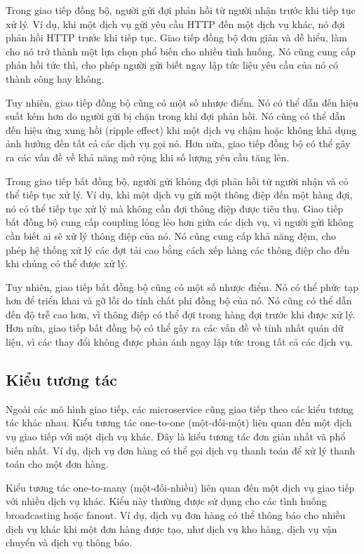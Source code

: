 Trong giao tiếp đồng bộ, người gửi đợi phản hồi từ người nhận trước khi tiếp
tục xử lý. Ví dụ, khi một dịch vụ gửi yêu cầu HTTP đến một dịch vụ khác, nó đợi
phản hồi HTTP trước khi tiếp tục. Giao tiếp đồng bộ đơn giản và dễ hiểu, làm
cho nó trở thành một lựa chọn phổ biến cho nhiều tình huống. Nó cũng cung cấp
phản hồi tức thì, cho phép người gửi biết ngay lập tức liệu yêu cầu của nó có
thành công hay không.

Tuy nhiên, giao tiếp đồng bộ cũng có một số nhược điểm. Nó có thể dẫn đến hiệu
suất kém hơn do người gửi bị chặn trong khi đợi phản hồi. Nó cũng có thể dẫn
đến hiệu ứng xung hồi (ripple effect) khi một dịch vụ chậm hoặc không khả dụng
ảnh hưởng đến tất cả các dịch vụ gọi nó. Hơn nữa, giao tiếp đồng bộ có thể gây
ra các vấn đề về khả năng mở rộng khi số lượng yêu cầu tăng lên.

Trong giao tiếp bất đồng bộ, người gửi không đợi phản hồi từ người nhận và có
thể tiếp tục xử lý. Ví dụ, khi một dịch vụ gửi một thông điệp đến một hàng đợi,
nó có thể tiếp tục xử lý mà không cần đợi thông điệp được tiêu thụ. Giao tiếp
bất đồng bộ cung cấp coupling lỏng lẻo hơn giữa các dịch vụ, vì người gửi không
cần biết ai sẽ xử lý thông điệp của nó. Nó cũng cung cấp khả năng đệm, cho phép
hệ thống xử lý các đợt tải cao bằng cách xếp hàng các thông điệp cho đến khi
chúng có thể được xử lý.

Tuy nhiên, giao tiếp bất đồng bộ cũng có một số nhược điểm. Nó có thể phức tạp
hơn để triển khai và gỡ lỗi do tính chất phi đồng bộ của nó. Nó cũng có thể dẫn
đến độ trễ cao hơn, vì thông điệp có thể đợi trong hàng đợi trước khi được xử
lý. Hơn nữa, giao tiếp bất đồng bộ có thể gây ra các vấn đề về tính nhất quán
dữ liệu, vì các thay đổi không được phản ánh ngay lập tức trong tất cả các dịch
vụ.

\subsection{Kiểu tương tác}
Ngoài các mô hình giao tiếp, các microservice cũng giao tiếp theo các kiểu
tương tác khác nhau. Kiểu tương tác one-to-one (một-đối-một) liên quan đến một
dịch vụ giao tiếp với một dịch vụ khác. Đây là kiểu tương tác đơn giản nhất và
phổ biến nhất. Ví dụ, dịch vụ đơn hàng có thể gọi dịch vụ thanh toán để xử lý
thanh toán cho một đơn hàng.

Kiểu tương tác one-to-many (một-đối-nhiều) liên quan đến một dịch vụ giao tiếp
với nhiều dịch vụ khác. Kiểu này thường được sử dụng cho các tình huống
broadcasting hoặc fanout. Ví dụ, dịch vụ đơn hàng có thể thông báo cho nhiều
dịch vụ khác khi một đơn hàng được tạo, như dịch vụ kho hàng, dịch vụ vận
chuyển và dịch vụ thông báo.

